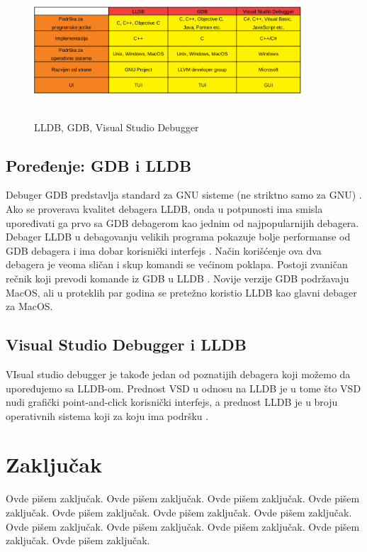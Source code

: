 \documentclass[a4paper]{article}
\begin{document}
\begin{figure}[h!]
	\begin{center}
		\includegraphics[width=100mm,height=50mm]{Slike/tabela_poredjenje1.png}
	\end{center}
	\caption{LLDB, GDB, Visual Studio Debugger \cite{gdb}\cite{lldb}\cite{vsd}}
	\label{fig:tabela_poredjenje1}
\end{figure}

\subsection{Poređenje: GDB i LLDB}
\label{subsec: GDB i LLDB}

Debuger GDB predstavlja standard za GNU sisteme (ne striktno samo za GNU) \cite{gdb}. Ako se proverava kvalitet debagera LLDB, onda u potpunosti ima smisla upoređivati ga prvo sa GDB debagerom kao jednim od najpopularnijih debagera. Debager LLDB u debagovanju velikih programa pokazuje bolje performanse od GDB debagera i ima dobar korisnički interfejs \cite{lldb_project_blog}. Način korišćenje ova dva debagera je veoma sličan i skup komandi se većinom poklapa. Postoji zvaničan rečnik koji prevodi komande iz GDB u LLDB \cite {lldb_to_gdb_map}. Novije verzije GDB podržavaju MacOS, ali u proteklih par godina se pretežno koristio LLDB kao glavni debager za MacOS.

\subsection{Visual Studio Debugger i LLDB}
\label{subsec: Visual Studio Debugger i LLDB}

VIsual studio debugger je takođe jedan od poznatijih debagera koji možemo da upoređujemo sa LLDB-om. Prednost VSD u odnosu na LLDB je u tome što VSD nudi grafički point-and-click korisnički interfejs, a prednost LLDB je u broju operativnih sistema koji za koju ima podršku \cite{vsd}.

\section{Zaključak}
\label{sec:zakljucak}

Ovde pišem zaključak. 
Ovde pišem zaključak. 
Ovde pišem zaključak. 
Ovde pišem zaključak. 
Ovde pišem zaključak. 
Ovde pišem zaključak. 
Ovde pišem zaključak. 
Ovde pišem zaključak. 
Ovde pišem zaključak. 
Ovde pišem zaključak. 
Ovde pišem zaključak. 
Ovde pišem zaključak. 


\appendix
 

\end{document}
